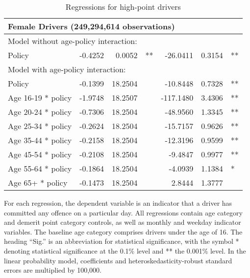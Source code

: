 \begin{table}
\begin{tabular}{l r r l r r l}
\hline 

\multicolumn{7}{l}{\textbf{Female Drivers} (249,294,614 observations)} \\ 

\hline
\multicolumn{7}{l}{Model without age-policy interaction: } \\ 
Policy                   &  -0.4252        &  0.0052       &   **       &  -26.0411        &  0.3154       &   **       \\ 
\hline
\multicolumn{7}{l}{Model with age-policy interaction: } \\ 
Policy                   &  -0.1399        &  18.2504       &            &  -10.8448        &  0.7328       &   **       \\ 
Age 16-19 * policy   &  -1.9748        &  18.2507       &            &  -117.1480        &  3.4306       &   **       \\ 
Age 20-24 * policy   &  -0.7306        &  18.2504       &            &  -48.9560        &  1.3345       &   **       \\ 
Age 25-34 * policy   &  -0.2624        &  18.2504       &            &  -15.7157        &  0.9626       &   **       \\ 
Age 35-44 * policy   &  -0.2158        &  18.2504       &            &  -12.3196        &  0.9599       &   **       \\ 
Age 45-54 * policy   &  -0.2108        &  18.2504       &            &  -9.4847        &  0.9977       &   **       \\ 
Age 55-64 * policy   &  -0.1864        &  18.2504       &            &  -4.0939        &  1.1384       &    *       \\ 
Age 65+ * policy   &  -0.1473        &  18.2504       &            &  2.8444        &  1.3777       &            \\ 

\hline 

\end{tabular} 
\caption{Regressions for high-point drivers} 
For each regression, the dependent variable is an indicator that a driver has committed  
any offence on a particular day.  
All regressions contain age category and demerit point category controls, 
as well as monthly and weekday indicator variables. 
The baseline age category comprises drivers under the age of 16. 
The heading ``Sig.'' is an abbreviation for statistical significance, with 
the symbol * denoting statistical significance at the 0.1\% level 
and ** the 0.001\% level. 
In the linear probability model, coefficients and heteroskedasticity-robust standard errors are  
multiplied by 100,000.  
\label{tab:seas_Logit_vs_LPMx100K_high_pt_regs} 
\end{table} 
 
